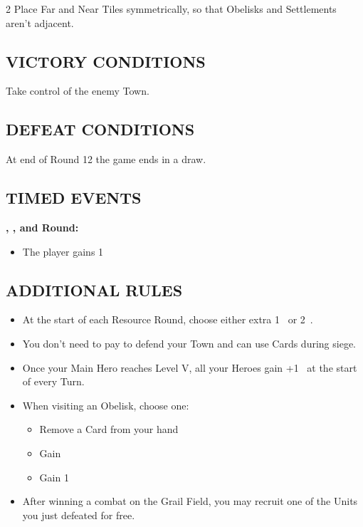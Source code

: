 \begin{multicols*}{2}
Place Far and Near Tiles symmetrically, so that Obelisks and Settlements aren't adjacent.

\subsection*{\MakeUppercase{Victory Conditions}}
Take control of the enemy Town.

\subsection*{\MakeUppercase{Defeat Conditions}}
At end of Round 12 the game ends in a draw.

\subsection*{\MakeUppercase{Timed Events}}
\textbf{, , and  Round:}
\begin{itemize}
  \item The  player gains 1~
\end{itemize}

\subsection*{\MakeUppercase{Additional Rules}}
\begin{itemize}
  \item At the start of each Resource Round, choose either extra 1~ or 2~.
  \item You don't need to pay  to defend your Town and can use Cards during siege.
  \item Once your Main Hero reaches Level V, all your Heroes gain +1~ at the start of every Turn.
  \item When visiting an Obelisk, choose one:
    \begin{itemize}
      \item Remove a Card from your hand
      \item Gain 
      \item Gain 1~
    \end{itemize}
  \item After winning a combat on the Grail Field, you may recruit one of the Units you just defeated for free.
\end{itemize}


\end{multicols*}
